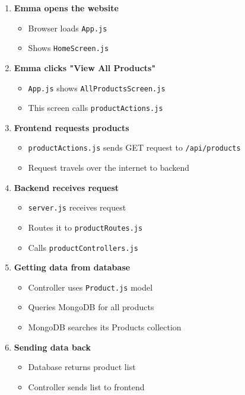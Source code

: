 \documentclass[12pt]{article}
\begin{document}
\begin{enumerate}
    \item \textbf{Emma opens the website}
    \begin{itemize}
        \item Browser loads \texttt{App.js}
        \item Shows \texttt{HomeScreen.js}
    \end{itemize}
    
    \item \textbf{Emma clicks "View All Products"}
    \begin{itemize}
        \item \texttt{App.js} shows \texttt{AllProductsScreen.js}
        \item This screen calls \texttt{productActions.js}
    \end{itemize}
    
    \item \textbf{Frontend requests products}
    \begin{itemize}
        \item \texttt{productActions.js} sends GET request to \texttt{/api/products}
        \item Request travels over the internet to backend
    \end{itemize}
    
    \item \textbf{Backend receives request}
    \begin{itemize}
        \item \texttt{server.js} receives request
        \item Routes it to \texttt{productRoutes.js}
        \item Calls \texttt{productControllers.js}
    \end{itemize}
    
    \item \textbf{Getting data from database}
    \begin{itemize}
        \item Controller uses \texttt{Product.js} model
        \item Queries MongoDB for all products
        \item MongoDB searches its Products collection
    \end{itemize}
    
    \item \textbf{Sending data back}
    \begin{itemize}
        \item Database returns product list
        \item Controller sends list to frontend
    \end{itemize}
    

\end{enumerate}
\end{document}
